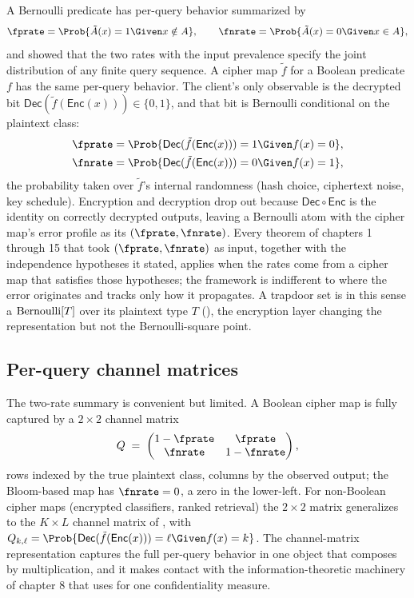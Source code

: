 A Bernoulli predicate has per-query behavior summarized by
\[
  \fprate = \Prob{\tilde A(x) = 1 \Given x \notin A},
  \qquad
  \fnrate = \Prob{\tilde A(x) = 0 \Given x \in A},
\]
and  showed
that the two rates with the input prevalence specify the joint
distribution of any finite query sequence. A cipher map $\tilde f$ for a
Boolean predicate $f$ has the same per-query behavior. The client's only
observable is the decrypted bit $\mathsf{Dec}(\tilde f(\mathsf{Enc}(x)))
\in \{0, 1\}$, and that bit is Bernoulli conditional on the plaintext
class:
\begin{align*}
  \fprate &= \Prob{\mathsf{Dec}(\tilde f(\mathsf{Enc}(x))) = 1 \Given f(x) = 0},\\
  \fnrate &= \Prob{\mathsf{Dec}(\tilde f(\mathsf{Enc}(x))) = 0 \Given f(x) = 1},
\end{align*}
the probability taken over $\tilde f$'s internal randomness (hash
choice, ciphertext noise, key schedule). Encryption and decryption drop
out because $\mathsf{Dec} \circ \mathsf{Enc}$ is the identity on
correctly decrypted outputs, leaving a Bernoulli atom with the cipher
map's error profile as its $(\fprate, \fnrate)$. Every theorem of
chapters 1 through 15 that took $(\fprate, \fnrate)$ as input, together
with the independence hypotheses it stated, applies when the rates come
from a cipher map that satisfies those hypotheses; the framework is
indifferent to where the error originates and tracks only how it
propagates. A trapdoor
set is in this sense a $\mathrm{Bernoulli}[T]$ over its plaintext type $T$
(), the encryption layer changing the
representation but not the Bernoulli-square point.

\subsection*{Per-query channel matrices}

The two-rate summary is convenient but limited. A Boolean cipher map is
fully captured by a $2 \times 2$ channel matrix
\[
  Q \;=\;
  \begin{pmatrix}
    1 - \fprate & \fprate \\
    \fnrate & 1 - \fnrate
  \end{pmatrix},
\]
rows indexed by the true plaintext class, columns by the observed
output; the Bloom-based map has $\fnrate = 0$, a zero in the lower-left.
For non-Boolean cipher maps (encrypted classifiers, ranked retrieval)
the $2 \times 2$ matrix generalizes to the $K \times L$ channel matrix
of , with $Q_{k,\ell} = \Prob{\mathsf{Dec}(\tilde
f(\mathsf{Enc}(x))) = \ell \Given f(x) = k}$. The channel-matrix
representation captures the full per-query behavior in one object that
composes by multiplication, and it makes contact with the
information-theoretic machinery of chapter 8 that
 uses for one confidentiality
measure.

